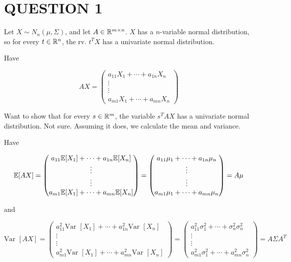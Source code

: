 \documentclass[a4paper]{article}
\begin{document}
	
\maketitle

\section{QUESTION 1}


Let $ X \sim N_{n}(\mu,\Sigma) $, and let $ A \in \mathbb{R}^{m \times n} $.
$ X $ has a $ n $-variable normal distribution, so for every $ t \in \mathbb{R}^{n}  $, the rv. $ t^{T} X $ has a univariate normal distribution.


Have


\[ AX = \begin{pmatrix}
a_{11} X_{1} + \cdots + a_{1n} X_{n} \\
\vdots \\
\vdots \\
a_{m1} X_{1} + \cdots + a_{mn} X_{n}
\end{pmatrix} \]

Want to show that for every $ s \in \mathbb{R}^{m}  $, the variable $ s^{T} A X $ has a univariate normal distribution. Not sure. 
Assuming it does, we calculate the mean and variance.

Have 

\[ \mathbb{E} [AX] = \begin{pmatrix}
a_{11} \mathbb{E} [X_{1}] + \cdots + a_{1n} \mathbb{E} [X_{n}] \\
\vdots \\
\vdots \\
a_{m1} \mathbb{E} [X_{1}] + \cdots + a_{mn} \mathbb{E} [X_{n}]
\end{pmatrix} = \begin{pmatrix}
a_{11} \mu_{1} + \cdots + a_{1n} \mu_{n} \\
\vdots \\
\vdots \\
a_{m1} \mu_{1} + \cdots + a_{mn} \mu_{n}
\end{pmatrix} = A \mu  \]

and 


\[ \text{Var } [AX] = \begin{pmatrix}
a_{11}^{2} \text{Var } [X_{1}] + \cdots + a_{1n}^{2}  \text{Var } [X_{n}] \\
\vdots \\
\vdots \\
a_{m1}^{2} \text{Var } [X_{1}] + \cdots + a_{mn}^{2} \text{Var } [X_{n}]
\end{pmatrix} = \begin{pmatrix}
a_{11}^{2} \sigma_{1}^{2} + \cdots + \sigma_{n}^{2} \sigma_{n}^{2} \\
\vdots \\
\vdots \\
a_{m1}^{2} \sigma_{1}^{2} + \cdots + a_{mn}^{2} \sigma_{n}^{2}
\end{pmatrix} = A \Sigma A^{T} \]
\end{document}
